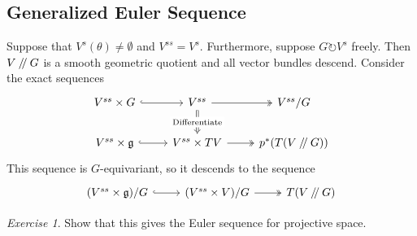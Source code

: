 \documentclass{article}
\theoremstyle{definition}
\theoremstyle{remark}
\newtheorem{exercise}[theorem]{Exercise}
\numberwithin{theorem}{section}
\newcommand{\sslash}{\mathbin{/\mkern-4mu/}}
\begin{document}
			\subsection{Generalized Euler Sequence}
			Suppose that $V^s(\theta)\neq \emptyset$ and $V^{ss}=V^{s}$. Furthermore, suppose $G\circlearrowright V^{s}$ freely. Then $V\sslash G$ is a smooth geometric quotient and all vector bundles descend. Consider the exact sequences
			\[\begin{tikzcd}
				{V^{ss}\times G} & {V^{ss}} & {V^{ss}/G} \\
				{V^{ss}\times\mathfrak{g}} & {V^{ss}\times TV} & {p^\ast(T(V\sslash G))}
				\arrow[hook, from=1-1, to=1-2]
				\arrow[two heads, from=1-2, to=1-3]
				\arrow[hook, from=2-1, to=2-2]
				\arrow[two heads, from=2-2, to=2-3]
				\arrow["{\text{Differentiate}}"{description}, Rightarrow, from=1-2, to=2-2]
			\end{tikzcd}\]
			This sequence is $G$-equivariant, so it descends to the sequence
			\[\begin{tikzcd}
				{(V^{ss}\times\mathfrak{g})/G} & {(V^{ss}\times V)/G} & {T(V\sslash G)}
				\arrow[hook, from=1-1, to=1-2]
				\arrow[two heads, from=1-2, to=1-3]
			\end{tikzcd}\]
			\begin{exercise}
				Show that this gives the Euler sequence for projective space.
			\end{exercise}
			
\end{document}
